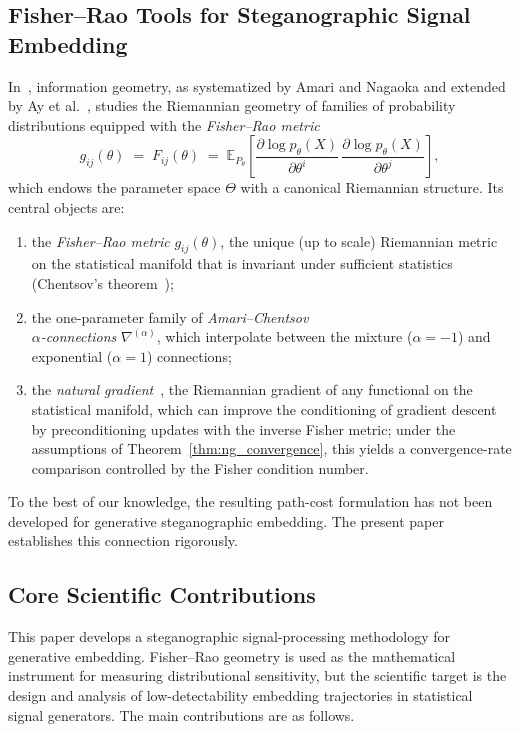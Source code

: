 \documentclass[a4paper,fleqn]{cas-dc}
\newcommand{\E}{\mathbb{E}}
\begin{document}
\subsection{Fisher--Rao Tools for Steganographic Signal Embedding}

In~\cite{amari2000methods}, information geometry, as systematized by Amari and
Nagaoka and extended by Ay et al.~\cite{ay2017information}, studies the
Riemannian geometry of families of probability distributions equipped with the
\emph{Fisher--Rao metric}
\begin{equation}
  g_{ij}(\theta) \;=\; F_{ij}(\theta)
  \;=\; \E_{P_\theta}\!\left[
    \frac{\partial \log p_\theta(X)}{\partial\theta^i}\,
    \frac{\partial \log p_\theta(X)}{\partial\theta^j}
  \right],
  \label{eq:fisher_rao_intro}
\end{equation}
which endows the parameter space $\Theta$ with a canonical Riemannian structure.
Its central objects are:
\begin{enumerate}
  \item the \emph{Fisher--Rao metric} $g_{ij}(\theta)$, the unique (up to
        scale) Riemannian metric on the statistical manifold that is invariant
        under sufficient statistics (Chentsov's theorem~\cite{chentsov1982statistical});
  \item the one-parameter family of \emph{Amari--Chentsov\\ $\alpha$-connections}
        $\nabla^{(\alpha)}$, which interpolate between the mixture
        ($\alpha=-1$) and exponential ($\alpha=1$) connections;
  \item the \emph{natural gradient}~\cite{amari1998natural}, the
        Riemannian gradient of any functional on the statistical manifold,
        which can improve the conditioning of gradient descent by preconditioning
updates with the inverse Fisher metric; under the assumptions of
Theorem~\ref{thm:ng_convergence}, this yields a convergence-rate comparison
controlled by the Fisher condition number.
\end{enumerate}
To the best of our knowledge, the resulting path-cost formulation has not been
developed for generative steganographic embedding.
The present paper establishes this connection rigorously.

\subsection{Core Scientific Contributions}

This paper develops a steganographic signal-processing methodology for
generative embedding. Fisher--Rao geometry is used as the mathematical
instrument for measuring distributional sensitivity, but the scientific target
is the design and analysis of low-detectability embedding trajectories in
statistical signal generators. The main contributions are as follows.
\end{document}
